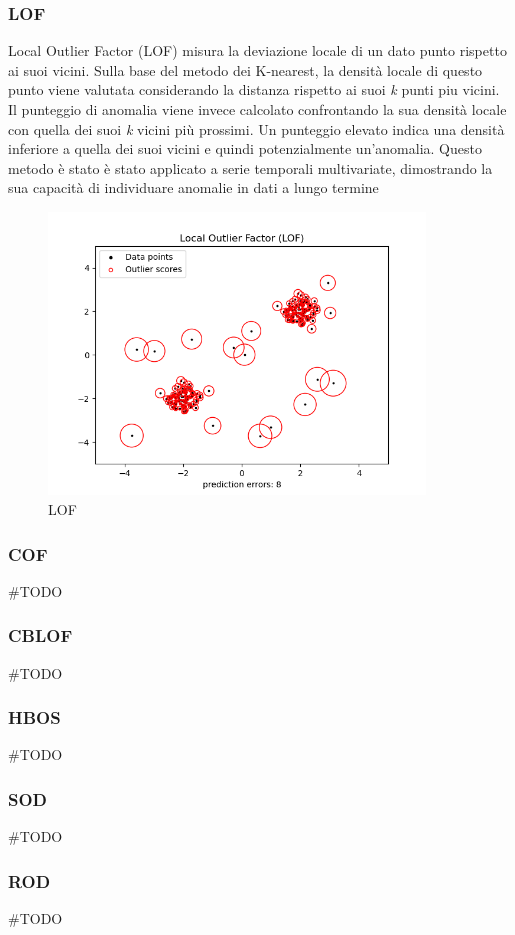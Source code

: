 \subsubsection{LOF}
Local Outlier Factor (LOF) misura la deviazione locale di un dato punto rispetto ai suoi vicini. Sulla base del metodo dei K-nearest, la densità locale di questo punto viene valutata considerando la distanza rispetto ai suoi \textit{k} punti piu vicini. Il punteggio di anomalia viene invece calcolato confrontando la sua densità locale con quella dei suoi \textit{k} vicini più prossimi. Un punteggio elevato indica una densità inferiore a quella dei suoi vicini e quindi potenzialmente un'anomalia. Questo metodo è stato è stato applicato a serie temporali multivariate, dimostrando la sua capacità di individuare anomalie in dati a lungo termine
\begin{figure}[t]
	\centering
	\includegraphics[width=10cm, scale=1]{images/lof}
	\caption{LOF}
	\label{lof}
\end{figure}

\subsubsection{COF}
\#TODO
\subsubsection{CBLOF}
\#TODO
\subsubsection{HBOS}
\#TODO
\subsubsection{SOD}
\#TODO
\subsubsection{ROD}
\#TODO


